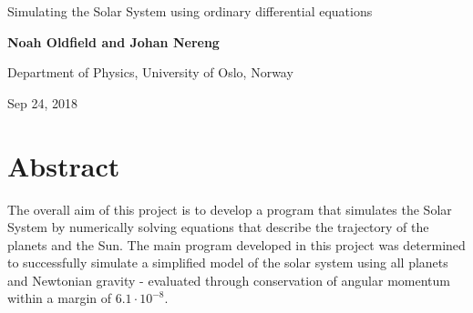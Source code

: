 \documentclass[%
oneside,                 %
final,                   %
10pt]{article}
\begin{document}

\newcommand{\exercisesection}[1]{\subsection*{#1}}






\thispagestyle{empty}

\begin{center}
{\LARGE\bf
\begin{spacing}{1.25}
Simulating the Solar System using ordinary differential equations
\end{spacing}
}
\end{center}


\begin{center}
{\bf Noah Oldfield and Johan Nereng}
\end{center}

    \begin{center}
\centerline{{\small Department of Physics, University of Oslo, Norway}}
\end{center}
    

\begin{center}
Sep 24, 2018
\end{center}

\vspace{1cm}

\section{Abstract}

The overall aim of this project is to develop a program that simulates the Solar System by numerically solving equations that describe the trajectory of the planets and the Sun.  The main program developed in this project was determined to successfully simulate a simplified model of  the solar system using all planets and Newtonian gravity - evaluated through conservation of angular momentum within a margin of $6.1 \cdot 10^{-8}$.
\end{document}

